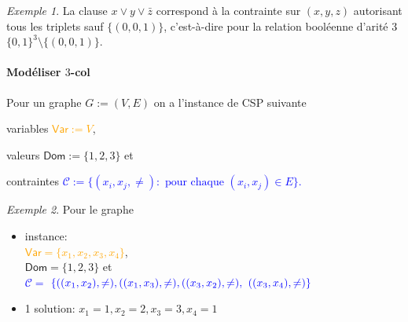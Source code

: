 \documentclass[a4paper,12pt]{article}
\theoremstyle{definition}
\theoremstyle{remark}
\newtheorem*{exemple}{Exemple}%
\newcommand{\Var}[0]{\ensuremath{\mathsf{Var}}}
\newcommand{\Dom}[0]{\ensuremath{\mathsf{Dom}}}
\begin{document}
\begin{exemple}
  La clause $x\lor y \lor \bar{z}$ correspond à la contrainte sur
  $(x,y,z)$ autorisant tous les triplets sauf $\{(0,0,1)\}$,
  c'est-à-dire pour la relation booléenne d'arité 3 $\{0,1\}^3 \setminus \{(0,0,1)\}$.
\end{exemple}


\paragraph{Modéliser $3$-col}
Pour un graphe $G:=(V,E)$ on a l'instance de CSP
suivante
\begin{compactitem}
\item variables \textcolor{orange}{$\Var:=V$},
\item valeurs
  \textcolor{OliveGreen}{$\Dom:=\{1,2,3\}$} et
\item contraintes
  \textcolor{blue}{$\mathcal{C}:=\{ (x_i,x_j, \neq) : \mbox{ pour
      chaque $(x_i,x_j) \in E$} \}.$}
  \end{compactitem}
  \begin{multicols}{2}
    \begin{exemple}
      Pour le graphe \\
      \begin{center}
      \end{center}

    
      \begin{itemize}
      \item instance: \\
        \textcolor{orange}{$\Var=\{x_1,x_2,x_3,x_4\}$},\\
        \textcolor{OliveGreen}{$\Dom=\{1,2,3\}$} et \\
        \textcolor{blue}{$\mathcal{C}=$}
        $\textcolor{blue}{\{((x_1,x_2),\neq), ((x_1,x_3),\neq), ((x_3,
          x_2),\neq),}$  $\textcolor{blue}{((x_3, x_4),\neq)\}}$
      \item 1 solution: $x_1=1,x_2=2,x_3=3,x_4=1$
      \end{itemize}
    \end{exemple}
  \end{multicols}
\end{document}
